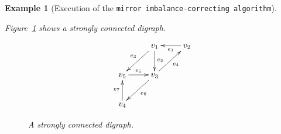 \documentclass[final]{siamltex}
\newtheorem{example}[theorem]{Example}
\begin{document}
\begin{example}[Execution of the {\texttt{mirror imbalance-correcting
    algorithm}\xspace}]\label{example:mirrow} {\rm
    Figure~\ref{fig:example_mirror} shows a strongly connected
    digraph.
    \begin{figure}
      \[
      \xymatrix{& v_1 \ar[d]^{e_2} \ar[dl]_{e_3} & v_2 \ar[l]^{e_1}\\
        v_5 \ar[r]^{e_5} & v_3 \ar[dl]^{e_6} \ar[ur]_{e_4} \\
        v_4 \ar[u]^{e_7} &} 	  
      \]
      \caption{A strongly connected digraph.}
      \label{fig:example_mirror}
    \end{figure}
    
    
    
    
    
    
    
    
    
    
    
    
    
    
    
    
    
}
\end{example}
\end{document}
